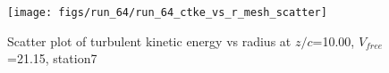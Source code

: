 \begin{figure}[H]
\centering
\texttt{[image: figs/run\_64/run\_64\_ctke\_vs\_r\_mesh\_scatter]}
\caption{Scatter plot of turbulent kinetic energy vs radius at $z/c$=10.00, $V_{free}$=21.15, station7}
\label{fig:run_64_ctke_vs_r_mesh_scatter}
\end{figure}


